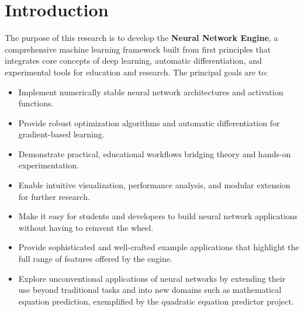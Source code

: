 \documentclass[11pt,a4paper]{report}
\begin{document}
\begin{abstract}
\begin{otherlanguage*}{bulgarian}
Ключовите приноси включват числено стабилни реализации, автоматична диференциация за изчисляване на градиенти, модулна архитектура, която улеснява бързото експериментиране, и изчерпателни инструменти за следене на производителността. Системата убедително свързва теорията с практиката, прави сложните концепции на дълбокото обучение по-достъпни и предоставя надеждни средства за реални задачи по разпознаване на образи и класификация.
\end{otherlanguage*}
\endgroup
\end{abstract}

\tableofcontents
\newpage

\chapter{Introduction}

The purpose of this research is to develop the \textbf{Neural Network Engine}, a comprehensive machine learning framework built from first principles that integrates core concepts of deep learning, automatic differentiation, and experimental tools for education and research. The principal goals are to:
\begin{itemize}
    \item Implement numerically stable neural network architectures and activation functions.
    \item Provide robust optimization algorithms and automatic differentiation for gradient-based learning.
    \item Demonstrate practical, educational workflows bridging theory and hands-on experimentation.
    \item Enable intuitive visualization, performance analysis, and modular extension for further research.
    \item Make it easy for students and developers to build neural network applications without having to reinvent the wheel.
    \item Provide sophisticated and well-crafted example applications that highlight the full range of features offered by the engine.
    \item Explore unconventional applications of neural networks by extending their use beyond traditional tasks and into new domains such as mathematical equation prediction, exemplified by the quadratic equation predictor project.
\end{itemize}
\end{document}
